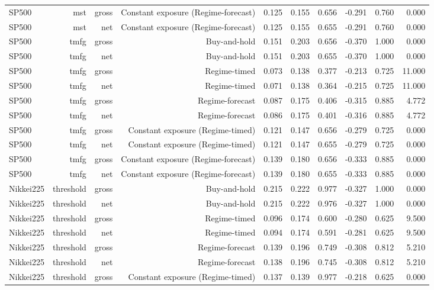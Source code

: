 \begin{tabular}{lrrrrrrrrr}
SP500 & mst & gross & Constant exposure (Regime-forecast) & 0.125 & 0.155 & 0.656 & -0.291 & 0.760 & 0.000 \\
SP500 & mst & net & Constant exposure (Regime-forecast) & 0.125 & 0.155 & 0.655 & -0.291 & 0.760 & 0.000 \\
SP500 & tmfg & gross & Buy-and-hold & 0.151 & 0.203 & 0.656 & -0.370 & 1.000 & 0.000 \\
SP500 & tmfg & net & Buy-and-hold & 0.151 & 0.203 & 0.655 & -0.370 & 1.000 & 0.000 \\
SP500 & tmfg & gross & Regime-timed & 0.073 & 0.138 & 0.377 & -0.213 & 0.725 & 11.000 \\
SP500 & tmfg & net & Regime-timed & 0.071 & 0.138 & 0.364 & -0.215 & 0.725 & 11.000 \\
SP500 & tmfg & gross & Regime-forecast & 0.087 & 0.175 & 0.406 & -0.315 & 0.885 & 4.772 \\
SP500 & tmfg & net & Regime-forecast & 0.086 & 0.175 & 0.401 & -0.316 & 0.885 & 4.772 \\
SP500 & tmfg & gross & Constant exposure (Regime-timed) & 0.121 & 0.147 & 0.656 & -0.279 & 0.725 & 0.000 \\
SP500 & tmfg & net & Constant exposure (Regime-timed) & 0.121 & 0.147 & 0.655 & -0.279 & 0.725 & 0.000 \\
SP500 & tmfg & gross & Constant exposure (Regime-forecast) & 0.139 & 0.180 & 0.656 & -0.333 & 0.885 & 0.000 \\
SP500 & tmfg & net & Constant exposure (Regime-forecast) & 0.139 & 0.180 & 0.655 & -0.333 & 0.885 & 0.000 \\
Nikkei225 & threshold & gross & Buy-and-hold & 0.215 & 0.222 & 0.977 & -0.327 & 1.000 & 0.000 \\
Nikkei225 & threshold & net & Buy-and-hold & 0.215 & 0.222 & 0.976 & -0.327 & 1.000 & 0.000 \\
Nikkei225 & threshold & gross & Regime-timed & 0.096 & 0.174 & 0.600 & -0.280 & 0.625 & 9.500 \\
Nikkei225 & threshold & net & Regime-timed & 0.094 & 0.174 & 0.591 & -0.281 & 0.625 & 9.500 \\
Nikkei225 & threshold & gross & Regime-forecast & 0.139 & 0.196 & 0.749 & -0.308 & 0.812 & 5.210 \\
Nikkei225 & threshold & net & Regime-forecast & 0.138 & 0.196 & 0.745 & -0.308 & 0.812 & 5.210 \\
Nikkei225 & threshold & gross & Constant exposure (Regime-timed) & 0.137 & 0.139 & 0.977 & -0.218 & 0.625 & 0.000 \\

\end{tabular}
